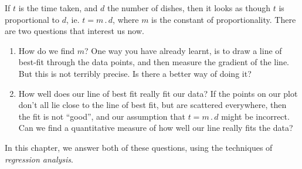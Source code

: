 If $t$ is the time taken, and $d$ the number of dishes, then it looks as though $t$ is proportional to $d$, ie. $t=m\,.\, d$, where $m$ is the constant of proportionality. There are two questions that interest us now.
\begin{enumerate}
\item How do we find $m$? One way you have already learnt, is to draw a line of best-fit through the data points, and then measure the gradient of the line. But this is not terribly precise. Is there a better way of doing it?
\item How well does our line of best fit really fit our data?  If the points on our plot don't all lie close to the line of best fit, but are scattered everywhere, then the fit is not ``good'', and our assumption that $t=m\,.\, d$ might be incorrect. Can we find a quantitative measure of how well our line really fits the data?
\end{enumerate}
In this chapter, we answer both of these questions, using the techniques of \emph{regression analysis}.
